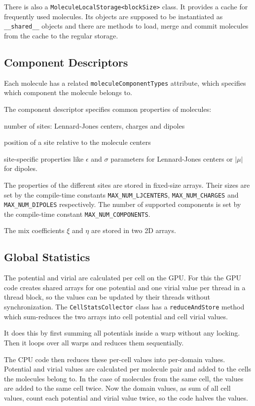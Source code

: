 There is also a \lstinline!MoleculeLocalStorage<blockSize>! class. It provides a cache for frequently used molecules. Its objects are supposed to be instantiated as \lstinline!__shared__! objects and there are methods to load, merge and commit molecules from the cache to the regular storage.

\subsection{Component Descriptors}
Each molecule has a related \lstinline!moleculeComponentTypes! attribute, which specifies which component the molecule belongs to.

The component descriptor specifies common properties of molecules:
\begin{compactitem}
\item number of sites: Lennard-Jones centers, charges and dipoles
\item position of a site relative to the molecule centers
\item site-specific properties like $\epsilon$ and $\sigma$ parameters for Lennard-Jones centers or $\left  | \mu \right | $ for dipoles.
\end{compactitem}
The properties of the different sites are stored in fixed-size arrays.
Their sizes are set by the compile-time constants \lstinline!MAX_NUM_LJCENTERS!, \lstinline!MAX_NUM_CHARGES! and \lstinline!MAX_NUM_DIPOLES! respectively.
The number of supported components is set by the compile-time constant \lstinline!MAX_NUM_COMPONENTS!.

The mix coefficients $\xi$ and $\eta$ are stored in two 2D arrays.

\subsection{Global Statistics}
The potential and virial are calculated per cell on the GPU. For this the GPU code creates shared arrays for one potential and one virial value per thread in a thread block, so the values can be updated by their threads without synchronization. The \lstinline!CellStatsCollector! class has a \lstinline!reduceAndStore! method which sum-reduces the two arrays into cell potential and cell virial values.

It does this by first summing all potentials inside a warp without any locking. Then it loops over all warps and reduces them sequentially.

The CPU code then reduces these per-cell values into per-domain values. Potential and virial values are calculated per molecule pair and added to the cells the molecules belong to. In the case of molecules from the same cell, the values are added to the same cell twice. Now the domain values, as sum of all cell values, count each potential and virial value twice, so the code halves the values.

